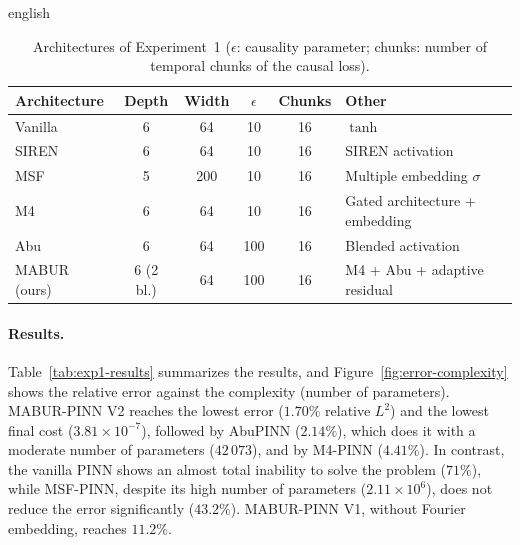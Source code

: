 \documentclass[0000.tex]{subfiles}
\begin{document}
\begin{hyphenrules}{english}
\begin{table}[htbp]
  \centering
  \caption[Architectures of Experiment~1]{Architectures of Experiment~1 ($\epsilon$: causality parameter; chunks: number of temporal
  chunks of the causal loss).}
  \label{tab:exp1-architectures}
  \small
  \begin{tabularx}{\linewidth}{@{}lccccX@{}}
    \toprule
    Architecture & Depth & Width & $\epsilon$ & Chunks & Other \\
    \midrule
    Vanilla \cite{raissi2019} & 6 & 64 & 10 & 16 & $\tanh$ \\
    SIREN \cite{sitzmann2020} & 6 & 64 & 10 & 16 & SIREN activation \\
    MSF \cite{wang2021eigenvector} & 5 & 200 & 10 & 16 & Multiple embedding $\sigma$ \\
    M4 \cite{wang2021gradient} & 6 & 64 & 10 & 16 & Gated architecture + embedding \\
    Abu \cite{wang2023abu} & 6 & 64 & 100 & 16 & Blended activation \\
    MABUR (ours) & 6 (2 bl.) & 64 & 100 & 16 & M4 + Abu + adaptive residual \\
    \bottomrule
  \end{tabularx}
\end{table}

\paragraph{Results.}
Table~\ref{tab:exp1-results} summarizes the results, and Figure~\ref{fig:error-complexity} shows the relative error
against the complexity (number of parameters). MABUR-PINN V2 reaches the lowest error ($1.70\%$ relative
$L^2$) and the lowest final cost ($3.81\times10^{-7}$), followed by AbuPINN ($2.14\%$), which does it with
a moderate number of parameters ($42\,073$), and by M4-PINN ($4.41\%$). In contrast, the vanilla PINN shows
an almost total inability to solve the problem ($71\%$), while MSF-PINN, despite its high number of
parameters ($2.11\times10^{6}$), does not reduce the error significantly ($43.2\%$). MABUR-PINN V1, without
Fourier embedding, reaches $11.2\%$.


\end{hyphenrules}
\end{document}
